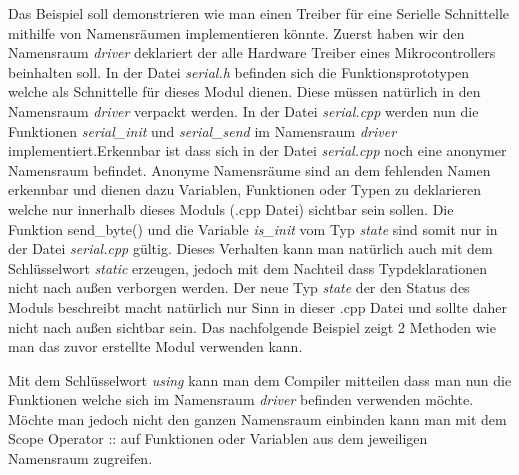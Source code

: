 \documentclass[MES,Master,ngerman]{twbook}%
\begin{document}
\begin{figure}[!htb]
	\begin{subfigure}[b]{0.5\textwidth}
		
		\label{fig:15}
	\end{subfigure}
	\begin{subfigure}[b]{0.5\textwidth}
		
		\label{fig:16}
	\end{subfigure}
\end{figure}
\newpage
Das Beispiel soll demonstrieren wie man einen Treiber für eine Serielle Schnittelle mithilfe von Namensräumen implementieren könnte. Zuerst haben wir den Namensraum \textit{driver} deklariert der alle Hardware Treiber eines Mikrocontrollers beinhalten soll. In der Datei \textit{serial.h} befinden sich die Funktionsprototypen welche als Schnittelle für dieses Modul dienen. Diese müssen natürlich in den Namensraum \textit{driver} verpackt werden. In der Datei \textit{serial.cpp} werden nun die Funktionen \textit{serial\_init} und \textit{serial\_send} im Namensraum \textit{driver} implementiert.\newline \newline Erkennbar ist dass sich in der Datei \textit{serial.cpp} noch eine anonymer Namensraum befindet. Anonyme Namensräume sind an dem fehlenden Namen erkennbar und dienen dazu Variablen, Funktionen oder Typen zu deklarieren welche nur innerhalb dieses Moduls (.cpp Datei) sichtbar sein sollen. Die Funktion send\_byte() und die Variable \textit{is\_init} vom Typ \textit{state} sind somit nur in der Datei \textit{serial.cpp} gültig. Dieses Verhalten kann man natürlich auch mit dem Schlüsselwort \textit{static} erzeugen, jedoch mit dem Nachteil dass Typdeklarationen nicht nach außen verborgen werden. Der neue Typ \textit{state} der den Status des Moduls beschreibt macht natürlich nur Sinn in dieser .cpp Datei und sollte daher nicht nach außen sichtbar sein. Das nachfolgende Beispiel zeigt 2 Methoden wie man das zuvor erstellte Modul verwenden kann.

\begin{figure}[!htb]
	\begin{subfigure}[b]{0.5\textwidth}
		
		\label{fig:17}
	\end{subfigure}
	\begin{subfigure}[b]{0.5\textwidth}
		
		\label{fig:18}
	\end{subfigure}
\end{figure}
Mit dem Schlüsselwort \textit{using} kann man dem Compiler mitteilen dass man nun die Funktionen welche sich im Namensraum \textit{driver} befinden verwenden möchte. Möchte man jedoch nicht den ganzen Namensraum einbinden kann man mit dem Scope Operator :: auf Funktionen oder Variablen aus dem jeweiligen Namensraum zugreifen.
\end{document}
